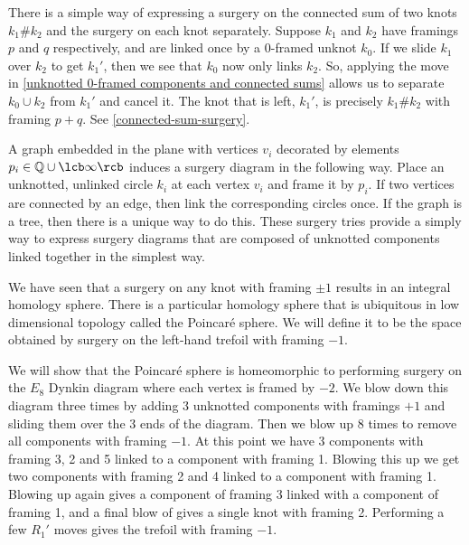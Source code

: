 \begin{example}
\label{unknotted 0-framed components and connected sums}
There is a simple way of expressing a surgery on the connected sum of two knots $k_1 \# k_2$ and the surgery on each knot separately. Suppose $k_1$ and $k_2$ have framings $p$ and $q$ respectively, and are linked once by a 0-framed unknot $k_0$. If we slide $k_1$ over $k_2$ to get $k_1'$, then we see that $k_0$ now only links $k_2$. So, applying the move in \cref{unknotted 0-framed components and connected sums} allows us to separate $k_0 \cup k_2$ from $k_1'$ and cancel it. The knot that is left, $k_1'$, is precisely $k_1 \# k_2$ with framing $p+q$. See \cref{connected-sum-surgery}. 
\end{example}

A graph embedded in the plane with vertices $v_i$ decorated by elements $p_i \in \mathbb Q \cup \lcb \infty \rcb$ induces a surgery diagram in the following way. Place an unknotted, unlinked circle $k_i$ at each vertex $v_i$ and frame it by $p_i$. If two vertices are connected by an edge, then link the corresponding circles once. If the graph is a tree, then there is a unique way to do this. These surgery tries provide a simply way to express surgery diagrams that are composed of unknotted components linked together in the simplest way.

We have seen that a surgery on any knot with framing $\pm 1$ results in an integral homology sphere. There is a particular homology sphere that is ubiquitous in low dimensional topology called the Poincar\'{e} sphere. We will define it to be the space obtained by surgery on the left-hand trefoil with framing $-1$. 

\begin{example}
We will show that the Poincar\'{e} sphere is homeomorphic to performing surgery on the $E_8$ Dynkin diagram where each vertex is framed by $-2$. We blow down this diagram three times by adding 3 unknotted components with framings $+1$ and sliding them over the 3 ends of the diagram. Then we blow up 8 times to remove all components with framing $-1$. At this point we have 3 components with framing 3, 2 and 5 linked to a component with framing 1. Blowing this up we get two components with framing 2 and 4 linked to a component with framing 1. Blowing up again gives a component of framing 3 linked with a component of framing 1, and a final blow of gives a single knot with framing 2. Performing a few $R_1'$ moves gives the trefoil with framing $-1$. 
\end{example}




